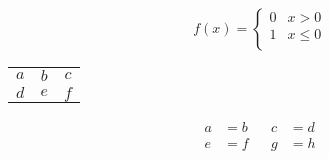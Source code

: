 \documentclass{minimal}
\begin{document}
\begin{equation}
  f(x) =
  \begin{cases}
    0 & x>0\\
    1 & x\le 0\\
  \end{cases}
\end{equation}

\begin{tabular}{ccc}
  $a$ & $b$ & $c$ \\
  $d$ & $e$ & $f$
\end{tabular}

\begin{align}
  a &= b && c &=d \\
  e &= f && g &=h
\end{align}
\end{document}
